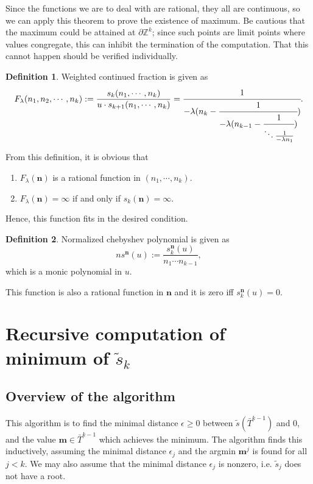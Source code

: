 \documentclass{article}
\theoremstyle{definition}
\newtheorem*{definition}{Definition}
\theoremstyle{plain}
\theoremstyle{remark}
\numberwithin{equation}{section}
\newcommand{\bZ}{\mathbb{Z}}
\begin{document}
Since the functions we are to deal with are rational,
they all are continuous, so we can apply this theorem to prove the existence of maximum.
Be cautious that the maximum could be attained at $\partial \bZ^k$;
since such points are limit points where values congregate, this can inhibit the termination of the computation.
That this cannot happen should be verified individually.

\begin{definition}
  Weighted continued fraction is given as
  \[
    F_\lambda(n_1, n_2, \cdots, n_k)
    := \frac{s_k(n_1, \cdots, n_k)}{u \cdot s_{k+1}(n_1, \cdots, n_k)}
    = \cfrac{1}{-\lambda (n_k - \cfrac{1}{-\lambda (n_{k-1} - \cfrac{1}{\ddots \frac{1}{-\lambda n_1}})})}.
  \]
\end{definition}

From this definition, it is obvious that
\begin{enumerate}
  \item $F_\lambda(\mathbf{n})$ is a rational function in $(n_1, \cdots, n_k)$.
  \item $F_\lambda(\mathbf{n}) = \infty$ if and only if $s_k(\mathbf{n}) = \infty$.
\end{enumerate}
Hence, this function fits in the desired condition.

\begin{definition}
  Normalized chebyshev polynomial is given as
  \[
    ns^\mathbf{n}(u) := \frac{s^\mathbf{n}_k (u)}{n_1 \cdots n_{k-1}},
  \]
  which is a monic polynomial in $u$.
\end{definition}

This function is also a rational function in $\mathbf{n}$ and it is zero iff $s^\mathbf{n}_k (u) = 0$.

\section{Recursive computation of minimum of $\tilde{s}_k$}

\subsection{Overview of the algorithm}

This algorithm is to find the minimal distance $\epsilon \geq 0$ between $\tilde{s}(\bar{T}^{k-1})$ and $0$,
and the value $\mathbf{m} \in \bar{T}^{k-1}$ which achieves the minimum.
The algorithm finds this inductively,
assuming the minimal distance $\epsilon_j$ and the argmin $\mathbf{m}^j$ is found for all $j < k$.
We may also assume that the minimal distance $\epsilon_j$ is nonzero,
i.e. $\tilde{s}_j$ does not have a root.
\end{document}
